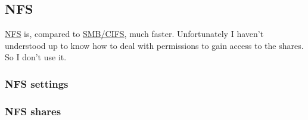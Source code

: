 

\subsection{NFS}

\href{https://en.wikipedia.org/wiki/Network_File_System}{NFS} is, compared to
\href{https://en.wikipedia.org/wiki/Server_Message_Block}{SMB/CIFS}, much
faster. Unfortunately I haven't understood up to know how to deal with
permissions to gain access to the shares. So I don't use it.

\subsubsection{NFS settings}


\subsubsection{NFS shares}

